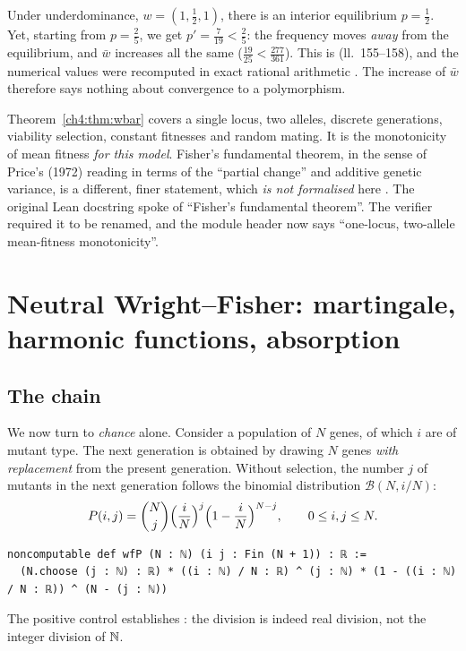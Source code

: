 \begin{remark}
Under underdominance, $w=(1,\frac12,1)$, there is an interior equilibrium $p=\frac12$. Yet, starting from
$p=\frac25$, we get $p'=\frac7{19}<\frac25$: the frequency moves \emph{away} from the equilibrium, and $\bar w$
increases all the same ($\frac{19}{25}<\frac{277}{361}$). This is  (ll.~155--158),
and the numerical values were recomputed in exact rational arithmetic \tierX. The increase of $\bar w$ therefore says
nothing about convergence to a polymorphism.
\end{remark}

\begin{warnbox}
Theorem~\ref{ch4:thm:wbar} covers a single locus, two alleles, discrete generations, viability
selection, constant fitnesses and random mating. It is the monotonicity of mean
fitness \emph{for this model}. Fisher's fundamental theorem, in the sense of Price's (1972) reading
in terms of the ``partial change'' \cite{ch4:Pri72} and additive genetic variance, is a different, finer statement, which
\emph{is not formalised} here \tierC. The original Lean docstring spoke of ``Fisher's fundamental theorem''. The
verifier required it to be renamed, and the module header now says ``one-locus, two-allele mean-fitness
monotonicity''.
\end{warnbox}

\section[Neutral Wright--Fisher]{Neutral Wright--Fisher: martingale, harmonic functions, absorption}\label{ch4:sec:wf}

\subsection{The chain}
We now turn to \emph{chance} alone. Consider a population of $N$ genes, of which $i$ are of mutant
type. The next generation is obtained by drawing $N$ genes \emph{with replacement} from the present generation.
Without selection, the number $j$ of mutants in the next generation follows the binomial distribution
$\mathcal B(N,i/N)$:
\[
P(i,j)=\binom Nj\Bigl(\frac iN\Bigr)^j\Bigl(1-\frac iN\Bigr)^{N-j},\qquad 0\le i,j\le N .
\]

\begin{leanbox}
\begin{lstlisting}[language=Lean]
noncomputable def wfP (N : ℕ) (i j : Fin (N + 1)) : ℝ :=
  (N.choose (j : ℕ) : ℝ) * ((i : ℕ) / N : ℝ) ^ (j : ℕ) * (1 - ((i : ℕ) / N : ℝ)) ^ (N - (j : ℕ))
\end{lstlisting}
The positive control  establishes : the division is indeed
real division, not the integer division of $\mathbb{N}$.
\end{leanbox}


